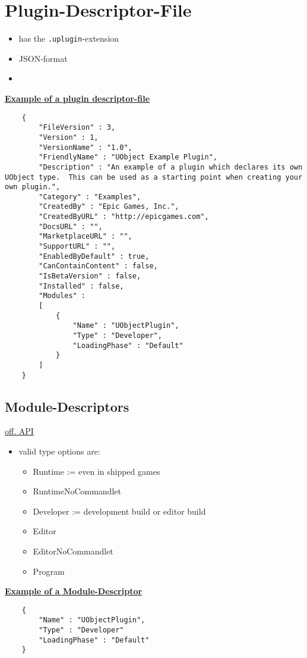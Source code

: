     \section{Plugin-Descriptor-File}
        \begin{itemize}
            \item has the \colorbox{mygray}{\lstinline{.uplugin}}-extension
            \item JSON-format
            \item 
        \end{itemize}
        \uline{\textbf{Example of a plugin descriptor-file}}
        \begin{lstlisting}
    {
        "FileVersion" : 3,
        "Version" : 1,
        "VersionName" : "1.0",
        "FriendlyName" : "UObject Example Plugin",
        "Description" : "An example of a plugin which declares its own UObject type.  This can be used as a starting point when creating your own plugin.",
        "Category" : "Examples",
        "CreatedBy" : "Epic Games, Inc.",
        "CreatedByURL" : "http://epicgames.com",
        "DocsURL" : "",
        "MarketplaceURL" : "",
        "SupportURL" : "",
        "EnabledByDefault" : true,
        "CanContainContent" : false,
        "IsBetaVersion" : false,
        "Installed" : false,
        "Modules" :
        [
            {
                "Name" : "UObjectPlugin",
                "Type" : "Developer",
                "LoadingPhase" : "Default"
            }
        ]
    }
\end{lstlisting}

        \subsection{Module-Descriptors}
            \href{https://docs.unrealengine.com/4.27/en-US/API/Runtime/Projects/FModuleDescriptor/}{off. API}
            \begin{itemize}
                \item valid type options are:
                \begin{itemize}
                    \item Runtime := even in shipped games
                    \item RuntimeNoCommandlet
                    \item Developer := development build or editor build
                    \item Editor
                    \item EditorNoCommandlet
                    \item Program
                \end{itemize}
            \end{itemize}
        \uline{\textbf{Example of a Module-Descriptor}}
        \begin{lstlisting}
    {
        "Name" : "UObjectPlugin",
        "Type" : "Developer"
        "LoadingPhase" : "Default"
    }
        \end{lstlisting}

